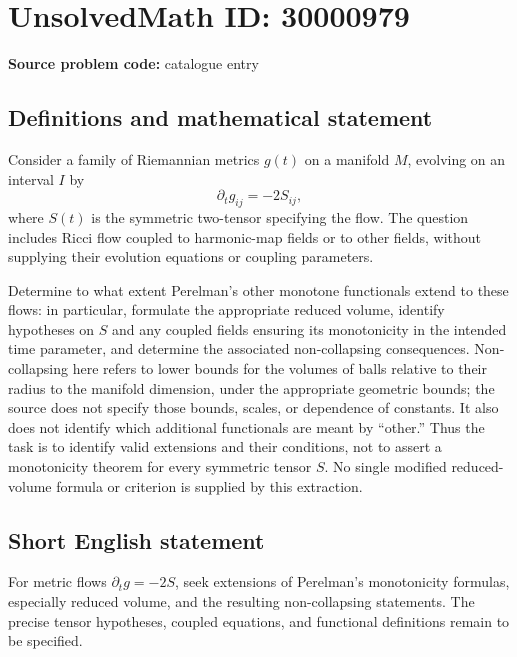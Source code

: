 \documentclass[11pt]{article}
\begin{document}
\section*{UnsolvedMath ID: 30000979}
\textbf{Source problem code:} catalogue entry
\subsection{Definitions and mathematical statement}
Consider a family of Riemannian metrics \(g(t)\) on a manifold \(M\), evolving on an interval \(I\) by
\[
\partial_t g_{ij}=-2S_{ij},
\]
where \(S(t)\) is the symmetric two-tensor specifying the flow. The question includes Ricci flow coupled to harmonic-map fields or to other fields, without supplying their evolution equations or coupling parameters.

Determine to what extent Perelman's other monotone functionals extend to these flows: in particular, formulate the appropriate reduced volume, identify hypotheses on \(S\) and any coupled fields ensuring its monotonicity in the intended time parameter, and determine the associated non-collapsing consequences. Non-collapsing here refers to lower bounds for the volumes of balls relative to their radius to the manifold dimension, under the appropriate geometric bounds; the source does not specify those bounds, scales, or dependence of constants. It also does not identify which additional functionals are meant by ``other.'' Thus the task is to identify valid extensions and their conditions, not to assert a monotonicity theorem for every symmetric tensor \(S\). No single modified reduced-volume formula or criterion is supplied by this extraction.
\subsection{Short English statement}
For metric flows \(\partial_t g=-2S\), seek extensions of Perelman's monotonicity formulas, especially reduced volume, and the resulting non-collapsing statements. The precise tensor hypotheses, coupled equations, and functional definitions remain to be specified.
\end{document}
